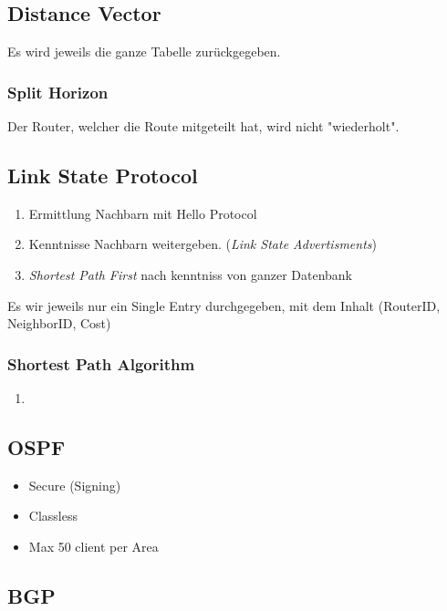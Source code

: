 \subsection{Distance Vector}

Es wird jeweils die ganze Tabelle zurückgegeben.

\subsubsection{Split Horizon}

Der Router, welcher die Route mitgeteilt hat, wird nicht "wiederholt".

\subsection{Link State Protocol}

\begin{enumerate}
	\item Ermittlung Nachbarn mit Hello Protocol
	\item Kenntnisse Nachbarn weitergeben. (\emph{Link State Advertisments})
	\item \emph{Shortest Path First} nach kenntniss von ganzer Datenbank
\end{enumerate}

Es wir jeweils nur ein Single Entry durchgegeben, mit dem Inhalt (RouterID, NeighborID, Cost)

\subsubsection{Shortest Path Algorithm}

\begin{enumerate}
\item %
\end{enumerate}


\subsection{OSPF}

\begin{itemize}
	\item Secure (Signing)
	\item Classless
	\item Max 50 client per Area
\end{itemize}


\subsection{BGP}

